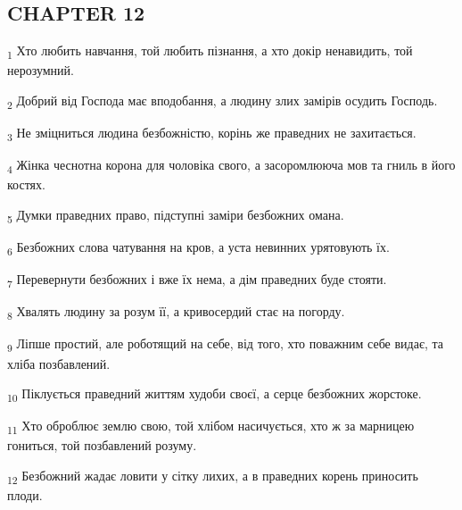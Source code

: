 \subsection{CHAPTER 12}
\begin{tcolorbox}
\textsubscript{1} Хто любить навчання, той любить пізнання, а хто докір ненавидить, той нерозумний.
\end{tcolorbox}
\begin{tcolorbox}
\textsubscript{2} Добрий від Господа має вподобання, а людину злих замірів осудить Господь.
\end{tcolorbox}
\begin{tcolorbox}
\textsubscript{3} Не зміцниться людина безбожністю, корінь же праведних не захитається.
\end{tcolorbox}
\begin{tcolorbox}
\textsubscript{4} Жінка чеснотна корона для чоловіка свого, а засоромлююча мов та гниль в його костях.
\end{tcolorbox}
\begin{tcolorbox}
\textsubscript{5} Думки праведних право, підступні заміри безбожних омана.
\end{tcolorbox}
\begin{tcolorbox}
\textsubscript{6} Безбожних слова чатування на кров, а уста невинних урятовують їх.
\end{tcolorbox}
\begin{tcolorbox}
\textsubscript{7} Перевернути безбожних і вже їх нема, а дім праведних буде стояти.
\end{tcolorbox}
\begin{tcolorbox}
\textsubscript{8} Хвалять людину за розум її, а кривосердий стає на погорду.
\end{tcolorbox}
\begin{tcolorbox}
\textsubscript{9} Ліпше простий, але роботящий на себе, від того, хто поважним себе видає, та хліба позбавлений.
\end{tcolorbox}
\begin{tcolorbox}
\textsubscript{10} Піклується праведний життям худоби своєї, а серце безбожних жорстоке.
\end{tcolorbox}
\begin{tcolorbox}
\textsubscript{11} Хто оброблює землю свою, той хлібом насичується, хто ж за марницею гониться, той позбавлений розуму.
\end{tcolorbox}
\begin{tcolorbox}
\textsubscript{12} Безбожний жадає ловити у сітку лихих, а в праведних корень приносить плоди.
\end{tcolorbox}
